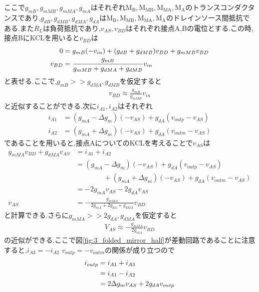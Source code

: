         \clearpage
        ここで$g_{mB},g_{mMB},g_{mMA},g_{mA}$はそれぞれ$\mathrm{M_{B},M_{MB},M_{MA},M_{A}}$のトランスコンダクタンスであり,$g_{dB},g_{dMB},g_{dMA},g_{dA}$は$\mathrm{M_{B},M_{MB},M_{MA},M_{A}}$のドレインソース間抵抗である.また$R_{L}$は負荷抵抗であり,$v_{AS},v_{BD}$はそれぞれ接点A,Bの電位とする.この時,接点BにKCLを用いると$v_{BD}$は
        \begin{align}
            0&=g_{mB}(-v_{in})+(g_{dB}+g_{dMB})v_{BD}+g_{mMB}v_{BD}     \notag\\
            v_{BD}&=\frac{g_{mB}}{ g_{mMB}+g_{dMA}+g_{dMB} }v_{in}      \notag
        \end{align}
        と表せる.ここで,$g_{mB}>>g_{dMA},g_{dMB}$を仮定すると
        \begin{align}
            v_{BD}\approx \frac{g_{mB}}{g_{mMB}}v_{in}      \label{eq:3_vbd}
        \end{align}
        と近似することができる.次に$i_{A1},i_{A2}$はそれぞれ
        \begin{align}
            i_{A1}&=(g_{mA}-\Delta g_{m})(-v_{AS})+g_{dA}(v_{outp}-v_{AS})      \label{eq:3_ia1}\\
            i_{A2}&=(g_{mA}+\Delta g_{m})(-v_{AS})+g_{dA}(v_{outm}-v_{AS})      \label{eq:3_ia2}   
        \end{align}
        であることを用いると,接点AについてのKCLを考えることで$v_{AS}$は
        \begin{align*}
            g_{mMA}v_{BD}+g_{dMA}v_{AS}&=i_{A1}+i_{A2}   \\
            &=(g_{mA}-\Delta g_{m})(-v_{AS})+g_{dA}(v_{outp}-v_{AS})    \\
            &\quad\quad\quad\quad +(g_{mA}+\Delta g_{m})(-v_{AS})+g_{dA}(v_{outm}-v_{AS})       \\
            &=-2g_{mA}v_{AS}-2g_{dA}v_{AS}  \\
            v_{AS} &= -\frac{ g_{mMA} }{ 2g_{mA}+2g_{dA}+g_{dMA} }v_{BD}
        \end{align*}
        と計算できる.さらに$g_{mMA}>>2g_{dA},g_{dMA}$を仮定すると
        \begin{align}
            V_{AS} \approx -\frac{g_{mMA}}{2g_{mA}} v_{BD}      \label{eq:3_vas}
        \end{align}
        の近似ができる.ここで図\ref{fig:3_folded_mirror_half}が差動回路であることに注意すると,\mbox{$i_{A3}=-i_{A2}$} \mbox{$v_{outp}=-v_{outm}$}の関係が成り立つので
        \begin{align}
            i_{outp}&=i_{A1}+i_{A3}     \notag\\
            &=i_{A1}-i_{A2}     \notag\\
            &=2\Delta g_{m}v_{AS}+2g_{dA}v_{outp}     \label{eq:3_ioutp}
        \end{align}
